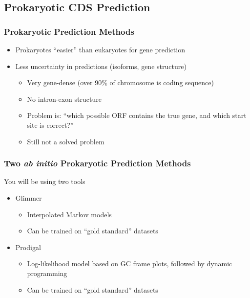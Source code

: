 %

\subsection{Prokaryotic CDS Prediction}
  \begin{frame}
  \frametitle{Prokaryotic Prediction Methods}
  \begin{itemize}
    \item Prokaryotes ``easier'' than eukaryotes for gene prediction
    \item Less uncertainty in predictions (isoforms, gene structure)
    \begin{itemize}
      \item Very gene-dense (over 90\% of chromosome is coding sequence)
      \item No intron-exon structure
      \item Problem is: ``which possible ORF contains the true gene, and which start site is correct?''
      \item Still not a solved problem
    \end{itemize}       
  \end{itemize}
\end{frame}

\begin{frame}
  \frametitle{Two \textit{ab initio} Prokaryotic Prediction Methods}
  You will be using two tools
  \begin{itemize}
    \item Glimmer
    \begin{itemize}
      \item Interpolated Markov models
      \item Can be trained on ``gold standard'' datasets
    \end{itemize}
    \item Prodigal
    \begin{itemize}
      \item Log-likelihood model based on GC frame plots, followed by dynamic programming
      \item Can be trained on ``gold standard'' datasets
    \end{itemize}
  \end{itemize}
\end{frame}

